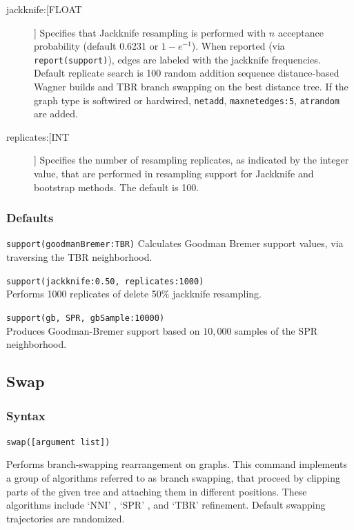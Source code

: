 \begin{description}
		\item[jackknife:[FLOAT]] Specifies that Jackknife resampling is performed with $n$ acceptance 
		probability (default 0.6231 or $1 - e^{-1}$). When reported (via \texttt{report(support)}), 
		edges are labeled with the jackknife frequencies. Default replicate search is 100 random addition 
		sequence distance-based Wagner builds and TBR branch swapping on the best distance tree.  
		If the graph type is softwired or hardwired, \texttt{netadd}, \texttt{maxnetedges:5}, \texttt{atrandom} are 
		added. 
		
		\item[replicates:[INT]] Specifies the number of resampling replicates, as indicated by the 
		integer value, that are performed in resampling support for Jackknife and bootstrap methods. 
		The default is 100.
		\end{description}	
		
	\subsubsection{Defaults}
		\texttt{support(goodmanBremer:TBR)} Calculates Goodman Bremer support values, 
		via traversing the TBR neighborhood.
		

		\begin{example}
			\item{\texttt{support(jackknife:0.50, replicates:1000)}\\Performs 1000 replicates of 
			delete 50\% jackknife resampling.}
				
			\item{\texttt{support(gb, SPR, gbSample:10000)}\\Produces Goodman-Bremer 
			support based on $10,000$ samples of the SPR neighborhood.}
		\end{example}

\subsection{Swap} 
\label{subsec:swap}
	\subsubsection{Syntax}
		\texttt{swap([argument list])}
			
	\begin{phygdescription}
		{Performs branch-swapping rearrangement on graphs. This command implements a 
		group of algorithms referred to as branch swapping, that proceed by clipping
		parts of the given tree and attaching them in different positions. These algorithms 
		include `NNI' \citep{CaminandSokal1965, Robinson1971}, `SPR' \citep{Dayhoff1969}, 
		and `TBR' \citep{Farris1988, swofford1990a} refinement.  Default swapping trajectories are randomized.}
	\end{phygdescription}
		

